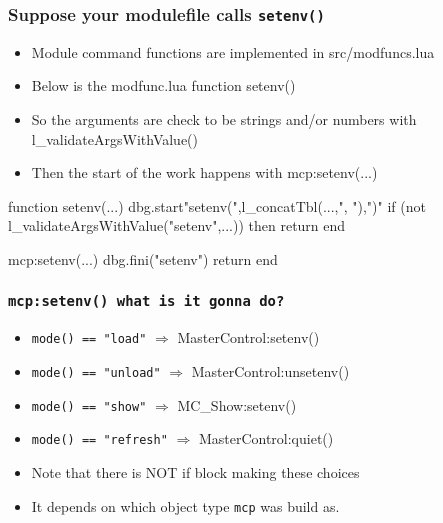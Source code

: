 \documentclass{beamer}
\begin{document}
\begin{frame}[fragile]
\begin{frame}[fragile]
    \frametitle{Suppose your modulefile calls \texttt{setenv()}}
  \begin{itemize}
    \item Module command functions are implemented in src/modfuncs.lua
    \item Below is the modfunc.lua function setenv()
    \item So the arguments are check to be strings and/or numbers with l\_validateArgsWithValue()
    \item  Then the start of the work happens with mcp:setenv(...)
  \end{itemize}
 {\tiny
    \begin{semiverbatim}
function setenv(...)
   dbg.start{"setenv(",l_concatTbl({...},", "),")"}
   if (not l_validateArgsWithValue("setenv",...)) then return end

   mcp:setenv(...)
   dbg.fini("setenv")
   return
end
    \end{semiverbatim}
}
\end{frame}

\begin{frame}[fragile]
    \frametitle{\texttt{mcp:setenv() what is it gonna do?}}
  \begin{itemize}
    \item \texttt{mode() == "load"} $\Rightarrow$ MasterControl:setenv()
    \item \texttt{mode() == "unload"} $\Rightarrow$ MasterControl:unsetenv()
    \item \texttt{mode() == "show"} $\Rightarrow$ MC_Show:setenv()
    \item \texttt{mode() == "refresh"} $\Rightarrow$ MasterControl:quiet()
    \item Note that there is NOT if block making these choices
    \item It depends on which object type \texttt{mcp} was build as. 
  \end{itemize}
\end{frame}


\end{frame}
\end{document}
